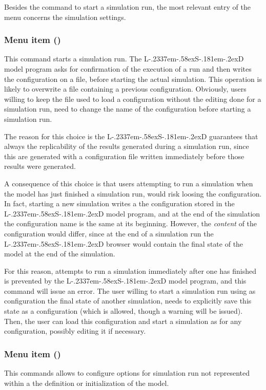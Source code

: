 \documentclass [11pt,a4paper] {book}
\def\LsD{{L\kern-.2337em\lower-.58ex\hbox{S}\kern-.181em\lower-.2ex\hbox{D}}\xspace}
\begin{document}
Besides the command to start a simulation run, the most relevant entry of the menu concerns the simulation settings. 

\subsubsection{Menu item  ()}

This command starts a simulation run. The \LsD model program asks for confirmation of the execution of a run and then writes the configuration on a file, before starting the actual simulation. This operation is likely to overwrite a file containing a previous configuration. Obviously, users willing to keep the file used to load a configuration without the editing done for a simulation run, need to change the name of the configuration before starting a simulation run.

The reason for this choice is the \LsD guarantees that always the replicability of the results generated during a simulation run, since this are generated with a configuration file written immediately before those results were generated.

A consequence of this choice is that users attempting to run a simulation when the model has just finished a simulation run, would risk loosing the configuration. In fact, starting a new simulation writes a the configuration stored in the \LsD model program, and at the end of the simulation the configuration name is the same at its beginning. However, the \textit{content} of the configuration would differ, since at the end of a simulation run the \LsD browser would contain the final state of the model at the end of the simulation. 

For this reason, attempts to run a simulation immediately after one has finished is prevented by the \LsD model program, and this command will issue an error. The user willing to start a simulation run using as configuration the final state of another simulation, needs to explicitly save this state as a configuration (which is allowed, though a warning will be issued). Then, the user can load this configuration and start a simulation as for any configuration, possibly editing it if necessary.

\subsubsection{Menu item  ()}

This commands allows to configure options for simulation run not represented within a the definition or initialization of the model.
\end{document}
